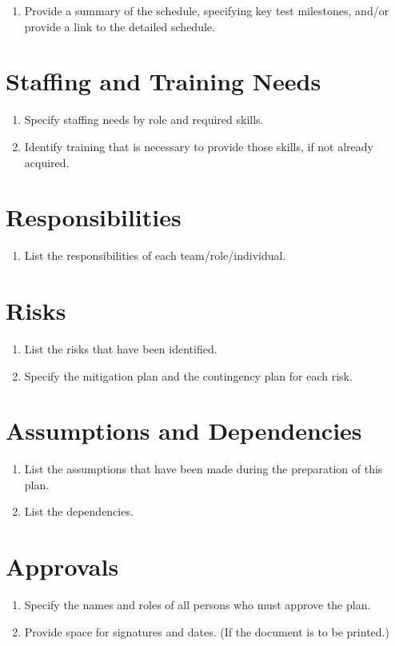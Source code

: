 \begin{enumerate}
	\item Provide a summary of the schedule, specifying key test milestones, and/or provide a link to the detailed schedule.
\end{enumerate}

\section{Staffing and Training Needs}

\begin{enumerate}
	\item Specify staffing needs by role and required skills.
	\item Identify training that is necessary to provide those skills, if not already acquired.
\end{enumerate}

\section{Responsibilities}

\begin{enumerate}
	\item List the responsibilities of each team/role/individual.
\end{enumerate}

\section{Risks}

\begin{enumerate}
	\item List the risks that have been identified.
	\item Specify the mitigation plan and the contingency plan for each risk.
\end{enumerate}

\section{Assumptions and Dependencies}

\begin{enumerate}
	\item List the assumptions that have been made during the preparation of this plan.
	\item List the dependencies.
\end{enumerate}
\section{Approvals}
\begin{enumerate}
	\item Specify the names and roles of all persons who must approve the plan.
	\item Provide space for signatures and dates. (If the document is to be printed.)
\end{enumerate}
